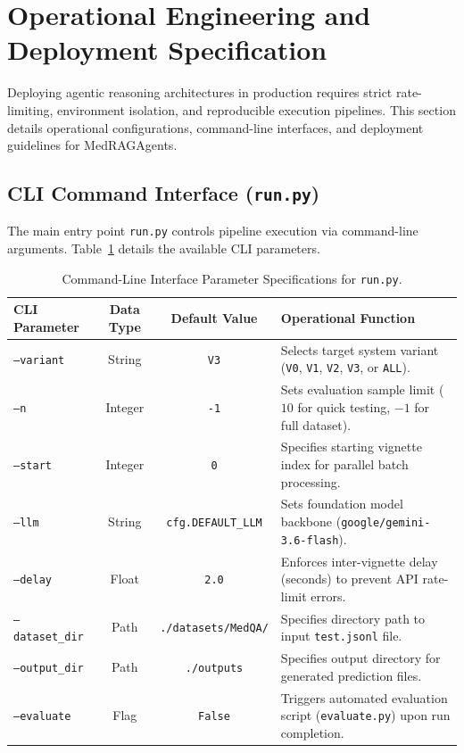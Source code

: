 \section{Operational Engineering and Deployment Specification}
\label{sec:operational_engineering}

Deploying agentic reasoning architectures in production requires strict rate-limiting, environment isolation, and reproducible execution pipelines. This section details operational configurations, command-line interfaces, and deployment guidelines for MedRAGAgents.

\subsection{CLI Command Interface (\texttt{run.py})}

The main entry point \texttt{run.py} controls pipeline execution via command-line arguments. Table~\ref{tab:cli_params} details the available CLI parameters.

\begin{table}[h!]
\centering
\caption{Command-Line Interface Parameter Specifications for \texttt{run.py}.}
\label{tab:cli_params}
\small
\begin{tabularx}{\textwidth}{l c c X}
\toprule
\textbf{CLI Parameter} & \textbf{Data Type} & \textbf{Default Value} & \textbf{Operational Function} \\
\midrule
\texttt{--variant} & String & \texttt{V3} & Selects target system variant (\texttt{V0}, \texttt{V1}, \texttt{V2}, \texttt{V3}, or \texttt{ALL}). \\
\texttt{--n} & Integer & \texttt{-1} & Sets evaluation sample limit ($10$ for quick testing, $-1$ for full dataset). \\
\texttt{--start} & Integer & \texttt{0} & Specifies starting vignette index for parallel batch processing. \\
\texttt{--llm} & String & \texttt{cfg.DEFAULT\_LLM} & Sets foundation model backbone (\texttt{google/gemini-3.6-flash}). \\
\texttt{--delay} & Float & \texttt{2.0} & Enforces inter-vignette delay (seconds) to prevent API rate-limit errors. \\
\texttt{--dataset\_dir} & Path & \texttt{./datasets/MedQA/} & Specifies directory path to input \texttt{test.jsonl} file. \\
\texttt{--output\_dir} & Path & \texttt{./outputs} & Specifies output directory for generated prediction files. \\
\texttt{--evaluate} & Flag & \texttt{False} & Triggers automated evaluation script (\texttt{evaluate.py}) upon run completion. \\
\bottomrule
\end{tabularx}
\end{table}

